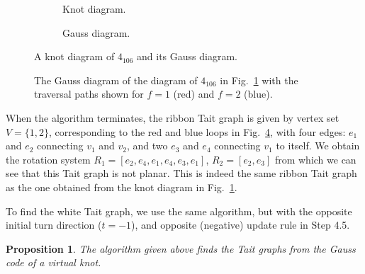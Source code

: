 \documentclass[12pt]{report}
\newtheorem*{proposition}{Proposition}
\theoremstyle{upright}
\begin{document}
\begin{figure}[hbt]
	\centering
	\hspace*{\fill}
	\begin{subfigure}[b]{0.4 \textwidth}
		\centering
		\def\svgscale{0.35}
		
		\caption{Knot diagram.}
		\label{fig:4_106-vknot}
	\end{subfigure}
	\hspace*{\fill} \hspace*{\fill}	\hspace*{\fill}
	\begin{subfigure}[b]{0.4 \textwidth}
		\centering
		\def\svgscale{1.2}
		
		\caption{Gauss diagram.}
		\label{fig:gauss-diagram-4_106}
	\end{subfigure}
	\hspace*{\fill} 
	\caption{A knot diagram of $4_{106}$ and its Gauss diagram.}
	\label{fig:knot-gauss-4_106}
\end{figure}

\begin{figure}[hbt!]
	\centering
	\def\svgscale{1.2}
	
	
	\caption{The Gauss diagram of the diagram of $4_{106}$ in Fig.~\ref{fig:4_106-vknot} with the traversal paths shown for $f = 1$ (red) and $f = 2$ (blue).}
	\label{fig:gauss-diagram-4_106-traversal}
\end{figure}

When the algorithm terminates, the ribbon Tait graph is given by vertex set $V = \{1, 2\}$, corresponding to the red and blue loops in Fig.~\ref{fig:gauss-diagram-4_106-traversal}, with four edges: $e_{1}$ and $e_{2}$ connecting $v_{1}$ and $v_{2}$, and two $e_{3}$ and $e_{4}$ connecting $v_{1}$ to itself. We obtain the rotation system $R_{1} = [e_{2}, e_{4}, e_{1}, e_{4}, e_{3}, e_{1}]$, $R_{2} = [e_{2}, e_{3}]$ from which we can see that this Tait graph is not planar. This is indeed the same ribbon Tait graph as the one obtained from the knot diagram in Fig.~\ref{fig:4_106-vknot}.

To find the white Tait graph, we use the same algorithm, but with the opposite initial turn direction ($t = -1$), and opposite (negative) update rule in Step 4.5.

\begin{proposition}
	The algorithm given above finds the Tait graphs from the Gauss code of a virtual knot.
\end{proposition}
\end{document}
